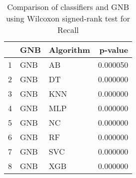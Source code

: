 \begin{table}
\footnotesize
\caption{Comparison of classifiers and GNB using Wilcoxon signed-rank test for Recall}
\label{tab:GNB wilcoxon Recall comparison}
\begin{tabular}{lllr}
\hline
 & GNB & Algorithm & p-value \\
\hline
1 & GNB & AB & 0.000050 \\
2 & GNB & DT & 0.000000 \\
3 & GNB & KNN & 0.000000 \\
4 & GNB & MLP & 0.000000 \\
5 & GNB & NC & 0.000000 \\
6 & GNB & RF & 0.000000 \\
7 & GNB & SVC & 0.000000 \\
8 & GNB & XGB & 0.000000 \\
\hline
\end{tabular}
\end{table}
